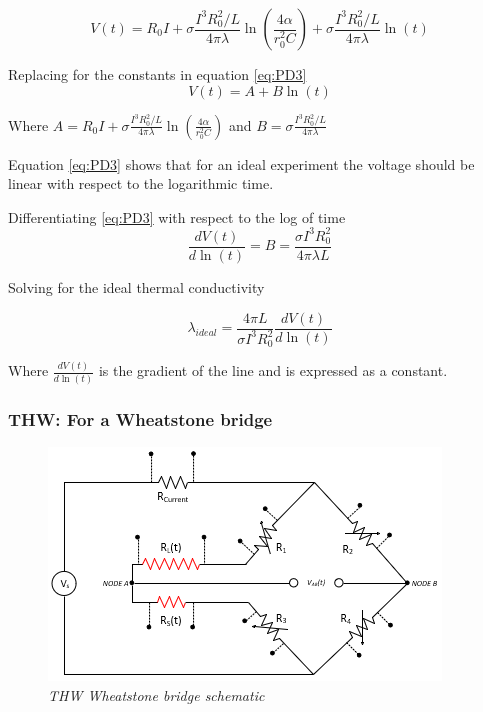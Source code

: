 \documentclass{article}
\begin{document}
	\begin{equation} \label{eq:PD3}
V(t) = R_0 I + \sigma \frac{I^3R_0^2/L}{4 \pi \lambda} \ln \left( \frac{4 \alpha } {r^2_0 C}\right) + \sigma \frac{I^3R_0^2/L}{4 \pi \lambda} \ln \left( t \right)
	\end{equation}

Replacing for the constants in equation \ref{eq:PD3}
	\begin{equation} \label{eq:PD3}
V(t) = A + B \ln \left( t \right)
	\end{equation}

Where $ A =  R_0 I + \sigma \frac{I^3R_0^2/L}{4 \pi \lambda} \ln \left( \frac{4 \alpha } {r^2_0 C}\right) $ and $ B = \sigma \frac{I^3R_0^2/L}{4 \pi \lambda}$

Equation \ref{eq:PD3} shows that for an ideal experiment the voltage should be linear with respect to the logarithmic time.

Differentiating \ref{eq:PD3} with respect to the log of time
$$\frac{dV(t)}{d \ln (t)} = B = \frac{\sigma I^3R_0^2}{4 \pi \lambda L}$$

Solving for the ideal thermal conductivity

$$ \lambda_{ideal}= \frac{4 \pi L}{\sigma I^3R_0^2} \frac{dV(t)}{d \ln (t)} $$

Where $\frac{dV(t)}{d \ln (t)} $ is the gradient of the line and is expressed as a constant.

\subsubsection{THW: For a Wheatstone bridge}

	\begin{figure}[h]
		\centering
		\includegraphics[scale=0.7]{WBPIC3}
		\caption{\textit{THW Wheatstone bridge schematic}}
		\label{fig:pcbdesign}
	\end{figure}
\end{document}
